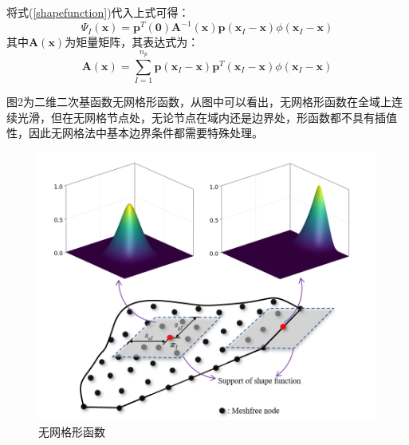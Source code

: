 \documentclass[a4paper]{article}
\begin{document}
将式(\ref{shapefunction})代入上式可得：
\begin{equation}
    \Psi_I(\pmb{x})=\pmb{p}^T(\pmb 0)\pmb{A}^{-1}(\pmb{x})\pmb{p}(\pmb{x}_I-\pmb{x})\phi(\pmb{x}_I-\pmb{x})
\end{equation}
其中$\pmb{A}(\pmb{x})$为矩量矩阵，其表达式为：
\begin{equation}
    \pmb{A}(\pmb{x})=\sum_{I=1}^{n_p}\pmb{p}(\pmb{x}_I-\pmb{x})\pmb{p}^T(\pmb{x}_I-\pmb{x})\phi(\pmb{x}_I-\pmb{x})
\end{equation}\par
图2为二维二次基函数无网格形函数，从图中可以看出，无网格形函数在全域上连续光滑，但在无网格节点处，无论节点在域内还是边界处，形函数都不具有插值性，因此无网格法中基本边界条件都需要特殊处理。
\begin{figure}[!h]
    \centering
    \includegraphics[scale=0.7]{firgure/zaishenghe.png}
    \caption{无网格形函数}
\end{figure}\newpage
\end{document}
